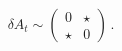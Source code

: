 \begin{equation}
\delta A_t \sim \left(\begin{array}{cc}
0 & \star\\
\star & 0
\end{array} \right) \,.
\end{equation}

